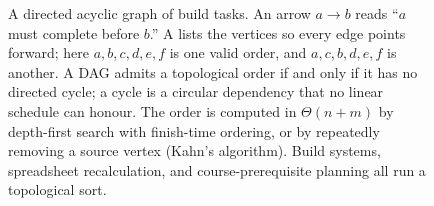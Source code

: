 \begin{figure}[ht]
\centering
{}
\caption{A directed acyclic graph of build tasks. An arrow $a \to b$
reads ``$a$ must complete before $b$.'' A 
lists the vertices so every edge points forward; here $a, b, c, d,
e, f$ is one valid order, and $a, c, b, d, e, f$ is another. A DAG
admits a topological order if and only if it has no directed cycle;
a cycle is a circular dependency that no linear schedule can honour.
The order is computed in $\Theta(n + m)$ by depth-first search with
finish-time ordering, or by repeatedly removing a source vertex
(Kahn's algorithm). Build systems, spreadsheet recalculation, and
course-prerequisite planning all run a topological sort.}
\label{fig:vol02:ch17:topo-sort}
\end{figure}
